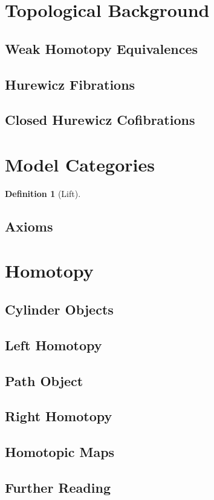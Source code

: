 \documentclass{amsart}
\theoremstyle{definition} \newtheorem{defn}[thm]{Definition}
\theoremstyle{definition} \newtheorem*{defn*}{Definition}
\theoremstyle{definition} \newtheorem{xca}[thm]{Exercise}
\theoremstyle{definition} \newtheorem{remark}[thm]{Remark}
\begin{document}
\section{Topological Background}
  \subsection{Weak Homotopy Equivalences}
  \subsection{Hurewicz Fibrations}
  \subsection{Closed Hurewicz Cofibrations}
  
\section{Model Categories}
  \begin{defn}[Lift]
  \end{defn}
  \subsection{Axioms}

\section{Homotopy}
  \subsection{Cylinder Objects}
  \subsection{Left Homotopy}
  \subsection{Path Object}
  \subsection{Right Homotopy}
  \subsection{Homotopic Maps}
  
\subsection{Further Reading}
  
  \cite{sets_maps_limits_colimits}
  \cite{dwyer1995homotopy}
\nocite{*}


\end{document}

